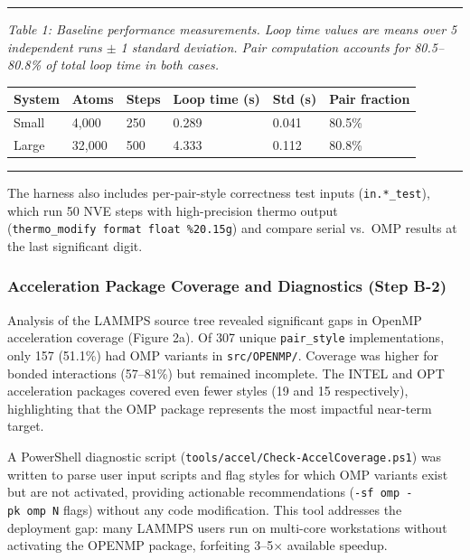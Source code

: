 \documentclass[
  11pt,
]{article}
\newcounter{none} %
\begin{document}
\begin{center}\rule{0.5\linewidth}{0.5pt}\end{center}

\emph{Table 1: Baseline performance measurements. Loop time values are
means over 5 independent runs \(\pm\) 1 standard deviation. Pair
computation accounts for 80.5--80.8\% of total loop time in both cases.}

{\def\LTcaptype{none} %
\begin{longtable}[]{@{}llllll@{}}
\toprule\noalign{}
System & Atoms & Steps & Loop time (s) & Std (s) & Pair fraction \\
\midrule\noalign{}
\endhead
\bottomrule\noalign{}
\endlastfoot
Small & 4,000 & 250 & 0.289 & 0.041 & 80.5\% \\
Large & 32,000 & 500 & 4.333 & 0.112 & 80.8\% \\
\end{longtable}
}

\begin{center}\rule{0.5\linewidth}{0.5pt}\end{center}

The harness also includes per-pair-style correctness test inputs
(\texttt{in.*\_test}), which run 50 NVE steps with high-precision thermo
output (\texttt{thermo\_modify\ format\ float\ \%20.15g}) and compare
serial vs.~OMP results at the last significant digit.

\subsubsection{Acceleration Package Coverage and Diagnostics (Step
B-2)}\label{acceleration-package-coverage-and-diagnostics-step-b-2}

Analysis of the LAMMPS source tree revealed significant gaps in OpenMP
acceleration coverage (Figure 2a). Of 307 unique \texttt{pair\_style}
implementations, only 157 (51.1\%) had OMP variants in
\texttt{src/OPENMP/}. Coverage was higher for bonded interactions
(57--81\%) but remained incomplete. The INTEL and OPT acceleration
packages covered even fewer styles (19 and 15 respectively),
highlighting that the OMP package represents the most impactful
near-term target.

A PowerShell diagnostic script
(\texttt{tools/accel/Check-AccelCoverage.ps1}) was written to parse user
input scripts and flag styles for which OMP variants exist but are not
activated, providing actionable recommendations
(\texttt{-sf\ omp\ -pk\ omp\ N} flags) without any code modification.
This tool addresses the deployment gap: many LAMMPS users run on
multi-core workstations without activating the OPENMP package,
forfeiting 3--5\(\times\) available speedup.
\end{document}
